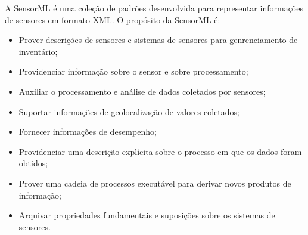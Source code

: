      \quad A \acrfull{SensorML} \cite{SML} é uma coleção de padrões
    desenvolvida para representar informações de sensores em formato XML. O propósito da \acrshort{SensorML} é:
    \begin{itemize}
      \item Prover descrições de sensores e sistemas de sensores para genrenciamento de inventário;
      \item Providenciar informação sobre o sensor e sobre processamento;
      \item Auxiliar o processamento e análise de dados coletados por sensores;
      \item Suportar informações de geolocalização de valores coletados;
      \item Fornecer informações de desempenho;
      \item Providenciar uma descrição explícita sobre o processo em que os dados foram obtidos;
      \item Prover uma cadeia de processos executável para derivar novos produtos de informação;
      \item Arquivar propriedades fundamentais e suposições sobre os sistemas de sensores.
    \end{itemize}
